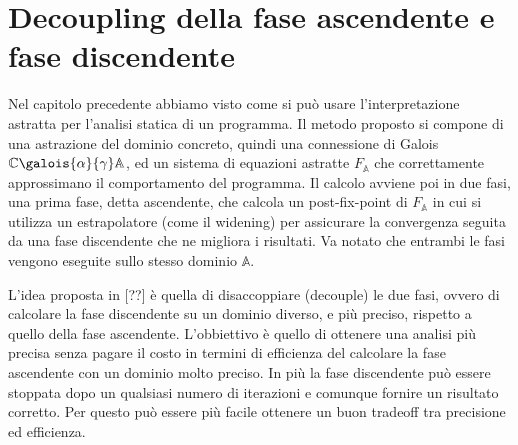 \chapter{Decoupling della fase ascendente e fase discendente}\label{chapter:decoupling}

Nel capitolo precedente abbiamo visto come si può usare l'interpretazione astratta per l'analisi statica di un programma. Il metodo proposto si compone di una astrazione del dominio concreto, quindi una connessione di Galois \(\mathbb{C}\galois{\alpha}{\gamma}\mathbb{A}\),  ed un sistema di equazioni  astratte \(F_{\mathbb{A}}\) che correttamente approssimano il comportamento del programma. Il calcolo avviene poi in due fasi, una prima fase, detta ascendente, che calcola un post-fix-point di \(F_{\mathbb{A}}\) in cui si utilizza un estrapolatore (come il widening) per assicurare la convergenza seguita da una fase discendente che ne migliora i risultati. Va notato che entrambi le fasi vengono eseguite sullo stesso dominio \(\mathbb{A}\).

L'idea proposta in [??] è quella di disaccoppiare (decouple) le due fasi, ovvero di calcolare la fase discendente su un dominio diverso, e più preciso, rispetto a quello della fase ascendente. L'obbiettivo è quello di ottenere una analisi più precisa senza pagare il costo in termini di efficienza del calcolare la fase ascendente con un dominio molto preciso. In più la fase discendente può essere stoppata dopo un qualsiasi numero di iterazioni e comunque fornire un risultato corretto. Per questo può essere più facile ottenere un buon tradeoff tra precisione ed efficienza.

